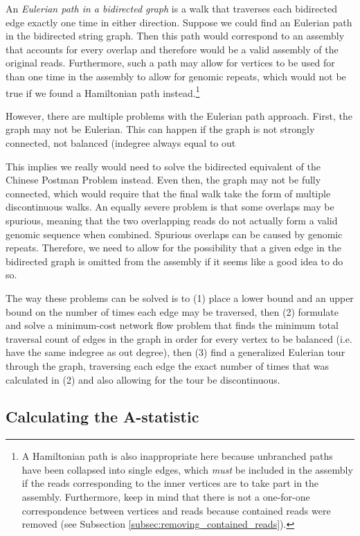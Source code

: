 \documentclass[10pt]{article}
\newcommand{\Subsection}[1]{Subsection \ref{#1}}
\newcommand{\KeyTerm}[1]{{\it #1}}
\begin{document}
An \KeyTerm{Eulerian path in a bidirected graph} is a walk that traverses each
bidirected edge exactly one time in either direction.  Suppose we could find an
Eulerian path in the bidirected string graph.  Then this path would correspond
to an assembly that accounts for every overlap and therefore would be a valid
assembly of the original reads.  Furthermore, such a path may allow for vertices
to be used for than one time in the assembly to allow for genomic repeats, which
would not be true if we found a Hamiltonian path instead.\footnote{A Hamiltonian
path is also inappropriate here because unbranched paths have been collapsed
into single edges, which {\em must} be included in the assembly if the reads
corresponding to the inner vertices are to take part in the assembly.
Furthermore, keep in mind that there is not a one-for-one correspondence between
vertices and reads because contained reads were removed (see
\Subsection{subsec:removing_contained_reads}).}

However, there are multiple problems with the Eulerian path approach.  First,
the graph may not be Eulerian.  This can happen if the graph is not strongly
connected, not balanced (indegree always equal to out

This implies we really would need to solve the
bidirected equivalent of the Chinese Postman Problem instead.  Even then, the
graph may not be fully connected, which would require that the final walk take
the form of multiple discontinuous walks.  An equally severe problem is that
some overlaps may be spurious, meaning that the two overlapping reads do not
actually form a valid genomic sequence when combined.  Spurious overlaps can be
caused by genomic repeats.  Therefore, we need to allow for the possibility that
a given edge in the bidirected graph is omitted from the assembly if it seems
like a good idea to do so.

The way these problems can be solved is to (1) place a lower bound and an upper
bound on the number of times each edge may be traversed, then (2) formulate and
solve a minimum-cost network flow problem that finds the minimum total traversal
count of edges in the graph in order for every vertex to be balanced (i.e. have
the same indegree as out degree), then (3) find a generalized Eulerian tour
through the graph, traversing each edge the exact number of times that was
calculated in (2) and also allowing for the tour be discontinuous.

\subsection{Calculating the A-statistic}
\end{document}
